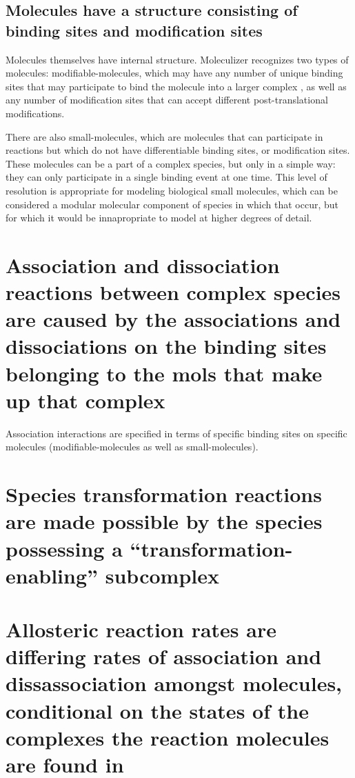 \subsection{Molecules have a structure consisting of binding sites and
  modification sites}

Molecules themselves have internal structure.  Moleculizer recognizes
two types of molecules: modifiable-molecules, which may have any
number of unique binding sites that may participate to bind the
molecule into a larger complex , as well as any number of modification
sites that can accept different post-translational modifications.

There are also small-molecules, which are molecules that can
participate in reactions but which do not have differentiable binding
sites, or modification sites.  These molecules can be a part of a
complex species, but only in a simple way: they can only participate
in a single binding event at one time.  This level of resolution is
appropriate for modeling biological small molecules, which can be
considered a modular molecular component of species in which that
occur, but for which it would be innapropriate to model at higher
degrees of detail.

\section{Association and dissociation reactions between complex
  species are caused by the associations and dissociations on the
  binding sites belonging to the mols that make up that complex}

Association interactions are specified in terms of specific binding
sites on specific molecules (modifiable-molecules as well as
small-molecules). 



\section{Species transformation reactions are made possible by the
  species possessing a ``transformation-enabling'' subcomplex}


\section{Allosteric reaction rates are differing rates of association
  and dissassociation amongst molecules, conditional on the states of
  the complexes the reaction molecules are found in}  

